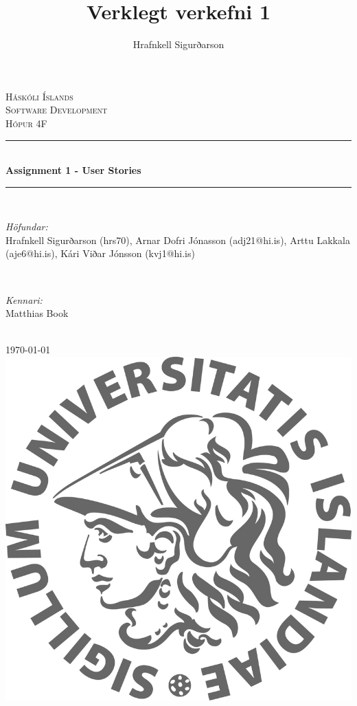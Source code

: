 \documentclass{fo}
\title{Verklegt verkefni 1}
\author{Hrafnkell Sigurðarson}
\begin{document}
\begin{titlepage}

\newcommand{\HRule}{\rule{\linewidth}{0.5mm}} 
\renewcommand{\thesection}{\arabic{section}}

\center 

\textsc{\LARGE Háskóli Íslands}\\[1.5cm] 
\textsc{\Large Software Development}\\[0.5cm] 
\textsc{\large Hópur 4F}\\[0.5cm] %

\HRule \\[0.4cm]
{ \huge \bfseries Assignment 1 - User Stories }\\[0.4cm] %
\HRule \\[1.5cm]
 
\begin{minipage}{0.4\textwidth}
\begin{flushleft} \large
\emph{Höfundar:}\\ %
Hrafnkell Sigurðarson (hrs70),
Arnar Dofri Jónasson (adj21@hi.is),
Arttu Lakkala (aje6@hi.is),
Kári Viðar Jónsson (kvj1@hi.is)
\end{flushleft}
\end{minipage}
~
\begin{minipage}{0.4\textwidth}
\begin{flushright} \large
\emph{Kennari:} \\
Matthias Book %
\end{flushright}
\end{minipage}\\[2cm]

{\large \today}\\[2cm] 
\includegraphics{pallas.jpg}\\[1cm]
\vfill 

\end{titlepage}
\renewcommand{\thesection}{\arabic{section}}
\end{document}
